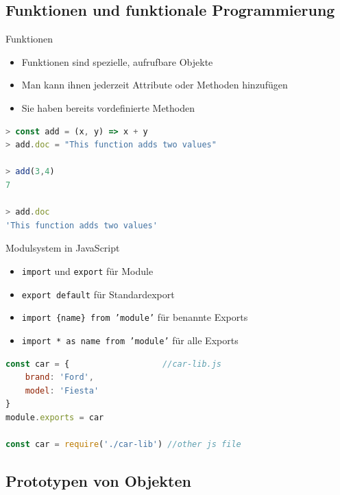 \subsection{Funktionen und funktionale Programmierung}

\begin{definition}{Funktionen}
    \begin{itemize}
        \item Funktionen sind spezielle, aufrufbare Objekte
        \item Man kann ihnen jederzeit Attribute oder Methoden hinzufügen
        \item Sie haben bereits vordefinierte Methoden
      \end{itemize}
\begin{lstlisting}[language=JavaScript, style=base]
> const add = (x, y) => x + y
> add.doc = "This function adds two values"

> add(3,4)
7

> add.doc
'This function adds two values'
\end{lstlisting}
\end{definition}

\begin{concept}{Modulsystem in JavaScript}
    \begin{itemize}
        \item \texttt{import} und \texttt{export} für Module
        \item \texttt{export default} für Standardexport
        \item \texttt{import \{name\} from 'module'} für benannte Exports
        \item \texttt{import * as name from 'module'} für alle Exports
    \end{itemize}
\begin{lstlisting}[language=JavaScript, style=base]
const car = {                   //car-lib.js
    brand: 'Ford',
    model: 'Fiesta'
}
module.exports = car

const car = require('./car-lib') //other js file
\end{lstlisting}
\end{concept}

\subsection{Prototypen von Objekten}

